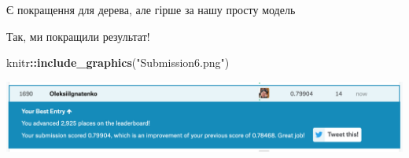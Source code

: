 \documentclass[ignorenonframetext,]{beamer}
\newenvironment{Shaded}{\begin{snugshade}}{\end{snugshade}}
\newcommand{\DataTypeTok}[1]{\textcolor[rgb]{0.13,0.29,0.53}{#1}}
\newcommand{\KeywordTok}[1]{\textcolor[rgb]{0.13,0.29,0.53}{\textbf{#1}}}
\newcommand{\NormalTok}[1]{#1}
\newcommand{\OperatorTok}[1]{\textcolor[rgb]{0.81,0.36,0.00}{\textbf{#1}}}
\newcommand{\OtherTok}[1]{\textcolor[rgb]{0.56,0.35,0.01}{#1}}
\newcommand{\StringTok}[1]{\textcolor[rgb]{0.31,0.60,0.02}{#1}}
\begin{document}
\begin{frame}[fragile]{Є покращення для дерева, але гірше за нашу просту
модель}
\protect\hypertarget{ux454-ux43fux43eux43aux440ux430ux449ux435ux43dux43dux44f-ux434ux43bux44f-ux434ux435ux440ux435ux432ux430-ux430ux43bux435-ux433ux456ux440ux448ux435-ux437ux430-ux43dux430ux448ux443-ux43fux440ux43eux441ux442ux443-ux43cux43eux434ux435ux43bux44c-1}{}

\begin{Shaded}
\end{Shaded}

\end{frame}

\begin{frame}[fragile]{Так, ми покращили результат!}
\protect\hypertarget{ux442ux430ux43a-ux43cux438-ux43fux43eux43aux440ux430ux449ux438ux43bux438-ux440ux435ux437ux443ux43bux44cux442ux430ux442}{}

\begin{Shaded}
\begin{Highlighting}[]
\NormalTok{knitr}\OperatorTok{::}\KeywordTok{include_graphics}\NormalTok{(}\StringTok{"Submission6.png"}\NormalTok{)}
\end{Highlighting}
\end{Shaded}

\includegraphics[width=26.75in]{Submission6}

\end{frame}
\end{document}
